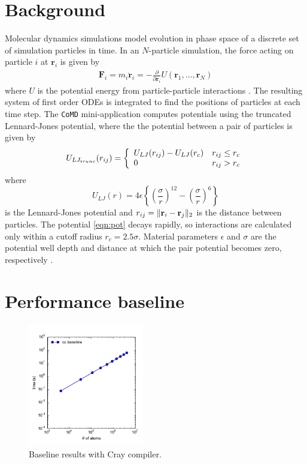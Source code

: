 \documentclass[12pt]{article}
\renewcommand{\v}[1]{\bold{#1}}
\begin{document}
\section{Background}
Molecular dynamics simulations model evolution in phase space of a
discrete set of simulation particles in time. In an $N$-particle
simulation, the force acting on particle $i$ at $\bm{r}_i$ is given by
\begin{align*}
    \textbf{F}_i = m_i \ddot{\bm{r}}_i = -\frac{\partial}{\partial \bm{r}_i} U(\bm{r}_1, \dots, \bm{r}_N)
\end{align*}
where $U$ is the potential energy from particle-particle interactions
\cite{Intro}.  The resulting system of first order ODEs is integrated
to find the positions of particles at each time step. The
\texttt{CoMD} mini-application computes potentials using the truncated
Lennard-Jones potential, where the the potential between a pair of
particles is given by
\begin{equation}
U_{LJ_{trunc}}(r_{ij}) = 
\left\{ \begin{array}{l c} 
     U_{LJ}(r_{ij}) - U_{LJ}(r_c) & r_{ij} \le r_c \\
     0 & r_{ij} > r_c
        \end{array} \right.
      \label{eqn:pot}
\end{equation}
where
\begin{equation}
    U_{LJ}(r) = 
    4 \epsilon \left\{ \left(\frac{\sigma}{r}\right)^{12} - 
    \left(\frac{\sigma}{r}\right)^6 \right\}
\end{equation}
is the Lennard-Jones potential and $r_{ij} = \|\v{r}_i-\v{r}_j\|_2$ is
the distance between particles. The potential \ref{eqn:pot} decays
rapidly, so interactions are calculated only within a cutoff radius
$r_c = 2.5 \sigma$. Material parameters $\epsilon$ and $\sigma$ are
the potential well depth and distance at which the pair potential
becomes zero, respectively \cite{Wiki}.

\section{Performance baseline}

\begin{figure}[h!]
  \centering
  \includegraphics[width=0.45\textwidth]{../figs/baseline_forceLJ.pdf}
  \caption{Baseline results with Cray compiler.}
  \label{fig:baseline}
\end{figure}
\end{document}
